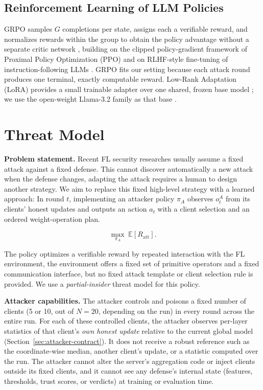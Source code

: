 \documentclass[conference,9pt]{IEEEtran}
\begin{document}
\subsection{Reinforcement Learning of LLM Policies}
GRPO samples $G$ completions per state, assigns each a verifiable reward, and normalizes rewards within the group to obtain the policy advantage without a separate critic network \cite{grpo}, building on the clipped policy-gradient framework of Proximal Policy Optimization (PPO) \cite{schulman2017ppo} and on RLHF-style fine-tuning of instruction-following LLMs \cite{ouyang2022instructgpt}. GRPO fits our setting because each attack round produces one terminal, exactly computable reward. Low-Rank Adaptation (LoRA) provides a small trainable adapter over one shared, frozen base model \cite{lora2022}; we use the open-weight Llama-3.2 family as that base \cite{dubey2024llama3}.

\section{Threat Model}
\label{sec:threat}

\textbf{Problem statement.} Recent FL security researches usually assume a fixed attack against a fixed defense. This cannot discover automatically a new attack when the defense changes, adapting the attack requires a human to design another strategy. We aim to replace this fixed high-level strategy with a learned approach: In round $t$, implementing an attacker policy $\pi_A$  observes $o_t^A$ from its clients’ honest updates and outputs an action $a_t$ with a client selection and an ordered weight-operation plan.

\begin{equation}
\max_{\pi_A}\;\mathbb{E}[R_{\mathrm{att}}].
\label{eq:agentic_problem}
\end{equation}

The policy optimizes a verifiable reward by repeated interaction with the FL environment, the environment offers a fixed set of primitive operators and a fixed communication interface, but no fixed attack template or client selection rule is provided. We use a \emph{partial-insider} threat model for this policy.

\textbf{Attacker capabilities.} The attacker controls and poisons a fixed number of clients (5 or 10, out of $N=20$, depending on the run) in every round across the entire run. For each of these controlled clients, the attacker observes per-layer statistics of that client's \emph{own honest update} relative to the current global model (Section~\ref{sec:attacker-contract}). It does not receive a robust reference such as the coordinate-wise median, another client's update, or a statistic computed over the run. The attacker cannot alter the server's aggregation code or inject clients outside its fixed clients, and it cannot see any defense's internal state (features, thresholds, trust scores, or verdicts) at training or evaluation time.
\end{document}
